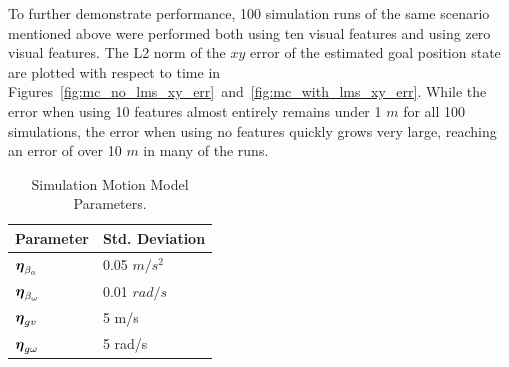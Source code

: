 To further demonstrate performance, 100 simulation runs of the same scenario
mentioned above were performed
both using ten visual features and using zero visual features. The L2 norm of
the $xy$ error of the estimated goal position state are plotted
with respect to time in
Figures~\ref{fig:mc_no_lms_xy_err}~and~\ref{fig:mc_with_lms_xy_err}. While the
error when using 10 features
almost entirely remains under 1 $m$ for all 100 simulations, the error when using
no features quickly grows very large, reaching an error of over 10 $m$ in many
of the runs.

\begin{table}[h!]
  \begin{center}
    \caption{Simulation Motion Model Parameters.}
    \label{tab:sim_process_noises}
    \begin{tabular}{l|l}
      \textbf{Parameter} & \textbf{Std. Deviation} \\
      \hline
      $\boldsymbol{\mathrm{\eta}}_{\beta_a}$ & 0.05 $m/s^2$ \\
      $\boldsymbol{\mathrm{\eta}}_{\beta_\omega}$ & 0.01 $rad/s$ \\
      $\boldsymbol{\mathrm{\eta}}_{gv}$ & 5 m/s \\
      $\boldsymbol{\mathrm{\eta}}_{g\omega}$ & 5 rad/s \\
    \end{tabular}
  \end{center}
\end{table}


